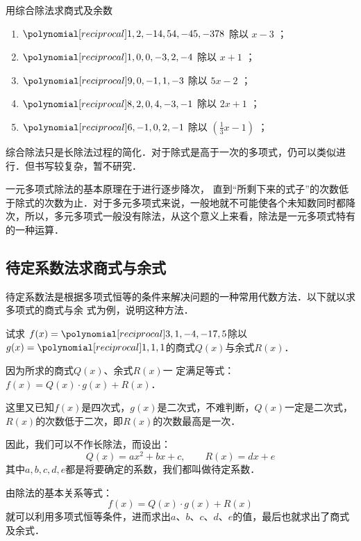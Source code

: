 \begin{ex}
    用综合除法求商式及余数
\begin{enumerate}
    \item  $\poly{1,2,-14,54,-45,-378}$   除以   $x-3$  ；
    \item   $\poly{1,0,0,-3,2,-4}$  除以   $x+1$  ；
    \item   $\poly{9,0,-1,1,-3}$  除以   $5x-2$  ；
    \item   $\poly{8,2,0,4,-3,-1}$  除以   $2x+1$  ；
    \item  $\poly{6,-1,0,2,-1}$   除以   $\left(\frac{1}{3}x-1\right)$  ；
\end{enumerate}
\end{ex}


综合除法只是长除法过程的简化．对于除式是高于一次的多项式，仍可以类似进行．但书写较复杂，暂不研究．

一元多项式除法的基本原理在于进行逐步降次，
直到“所剩下来的式子”的次数低于除式的次数为止．对于多元多项式来说，一般地就不可能使各个未知数同时都降次，所以，多元多项式一般没有除法，从这个意义上来看，除法是一元多项式特有的一种运算．


\subsection{待定系数法求商式与余式}
待定系数法是根据多项式恒等的条件来解决问题的一种常用代数方法．以下就以求多项式的商式与余
式为例，说明这种方法．

\begin{example}
    试求
    $f(x)=\poly{3,1,-4,-17,5}$除以$g(x) =\poly{1,1,1}$的商式$Q(x)$与余式$R(x)$．
\end{example}

\begin{analyze}
    因为所求的商式$Q(x)$、余式$R(x)$一
定满足等式：$f(x)=Q(x)\cdot g(x)+R(x)$．

这里又已知$f(x)$是四次式，$g(x)$是二次式，不难判断，$Q(x)$一定是二次式，$R(x)$的次数低于二次，即$R(x)$的次数最高是一次．

因此，我们可以不作长除法，而设出：
$$Q(x)=ax^2+bx+c,\qquad R(x)=dx+e$$
其中$a,b,c,d,e$都是将要确定的系数，我们都叫做待定系数．

由除法的基本关系等式：
$$f(x)=Q(x)\cdot g(x)+R(x)$$
就可以利用多项式恒等条件，进而求出$a$、$b$、$c$、$d$、$e$的值，最后也就求出了商式及余式．
\end{analyze}

